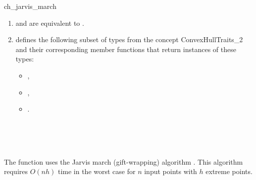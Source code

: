 \begin{ccRefFunction}{ch_jarvis_march}
\begin{enumerate}
   \item    {} and 
            are equivalent to .
   \item    {} defines the following subset of types from
            the concept ConvexHullTraits\_2 and their corresponding member
            functions that return instances of these types:
            \begin{itemize}
                \item {},
		\item {},
                \item {}.
            \end{itemize}
\end{enumerate}

\ccSeeAlso

 \\
 \\
 \\


\ccImplementation

The function uses the Jarvis march (gift-wrapping)
algorithm \cite{j-ichfs-73}. This algorithm requires $O(n h)$ time 
in the worst case for $n$ input points with $h$ extreme points.  
\end{ccRefFunction}


